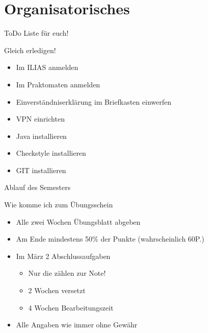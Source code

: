 \documentclass{beamer}
\begin{document}
\section{Organisatorisches}
\begin{frame}{ToDo Liste für euch!}
\begin{alertblock}{Gleich erledigen!}
\begin{itemize}
 \item Im ILIAS anmelden
 \item Im Praktomaten anmelden
 \item Einverständniserklärung im Briefkasten einwerfen
 \item VPN einrichten
 \item Java installieren
 \item Checkstyle installieren
 \item GIT installieren
\end{itemize}
\end{alertblock}
\end{frame}

\begin{frame}{Ablauf des Semesters}
\begin{alertblock}{Wie komme ich zum Übungsschein}
\begin{itemize}
 \item Alle zwei Wochen Übungsblatt abgeben
 \item Am Ende mindestens 50\% der Punkte (wahrscheinlich 60P.)
 \item Im März 2 Abschlussaufgaben
  \begin{itemize}
        \item Nur die zählen zur Note!
        \item 2 Wochen versetzt
        \item 4 Wochen Bearbeitungszeit
       \end{itemize}
  \pause
  \item Alle Angaben wie immer ohne Gewähr
\end{itemize}
\end{alertblock}
\end{frame}
\end{document}
